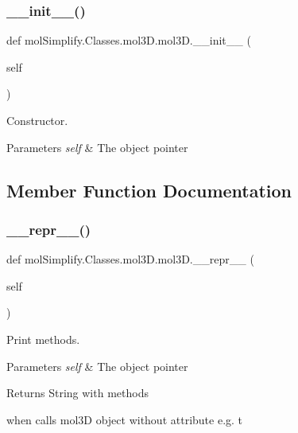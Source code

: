 \subsubsection{\texorpdfstring{\+\_\+\+\_\+init\+\_\+\+\_\+()}{\_\_init\_\_()}}
{\footnotesize\ttfamily def mol\+Simplify.\+Classes.\+mol3\+D.\+mol3\+D.\+\_\+\+\_\+init\+\_\+\+\_\+ (\begin{DoxyParamCaption}\item[{}]{self }\end{DoxyParamCaption})}



Constructor. 


\begin{DoxyParams}{Parameters}
{\em self} & The object pointer \\
\hline
\end{DoxyParams}


\subsection{Member Function Documentation}
\mbox{\label{classmolSimplify_1_1Classes_1_1mol3D_1_1mol3D_ac5a779ac0e20d07b60dc30fdb9a0f4d1}} 
\subsubsection{\texorpdfstring{\+\_\+\+\_\+repr\+\_\+\+\_\+()}{\_\_repr\_\_()}}
{\footnotesize\ttfamily def mol\+Simplify.\+Classes.\+mol3\+D.\+mol3\+D.\+\_\+\+\_\+repr\+\_\+\+\_\+ (\begin{DoxyParamCaption}\item[{}]{self }\end{DoxyParamCaption})}



Print methods. 


\begin{DoxyParams}{Parameters}
{\em self} & The object pointer \\
\hline
\end{DoxyParams}
\begin{DoxyReturn}{Returns}
String with methods \begin{DoxyVerb}when calls mol3D object without attribute e.g. t \end{DoxyVerb}
 
\end{DoxyReturn}
\mbox{\label{classmolSimplify_1_1Classes_1_1mol3D_1_1mol3D_a444e22d04c8ec79f1b2ce77ee9e1e8fc}} 
